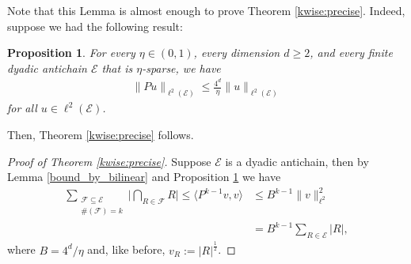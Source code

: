 \documentclass[oneside]{amsart}
\newtheorem{proposition}[theorem]{Proposition}
\theoremstyle{definition}
\theoremstyle{plain}
\numberwithin{equation}{section}
\numberwithin{theorem}{section}
\begin{document}
Note that this Lemma is almost enough to prove Theorem \ref{kwise:precise}.
Indeed, suppose we had the following result:
\begin{proposition} \label{gram}
  For every $\eta \in (0,1)$,
  every dimension $d \geq 2$,
  and every finite dyadic antichain $\mathcal{E}$ that is $\eta$-sparse,
  we have
  \begin{align*}
    \|Pu\|_{\ell^2(\mathcal{E})} \leq \frac{4^d}{\eta}
    \|u\|_{\ell^2(\mathcal{E})}
  \end{align*}
  for all $u \in \ell^2(\mathcal{E})$.
\end{proposition}
Then, Theorem \ref{kwise:precise} follows.
\begin{proof}[Proof of Theorem \ref{kwise:precise}]
  Suppose $\mathcal{E}$ is a dyadic antichain, then by Lemma
  \ref{bound_by_bilinear} and Proposition \ref{gram} we have
  \begin{align*}
    \sum_{\substack{\mathcal{F} \subseteq \mathcal{E} \\
    \#(\mathcal{F}) = k
    }} \Big|
    \bigcap_{R \in \mathcal{F}} R
    \Big| \leq \langle P^{k-1} v, v \rangle &\leq B^{k-1} \|v\|_{\ell^2}^2 \\
    &= B^{k-1} \sum_{R \in \mathcal{E}} |R|,
  \end{align*}
  where $B = 4^d / \eta$ and, like before, $v_R := |R|^{\frac{1}{2}}$.
\end{proof}
\end{document}
